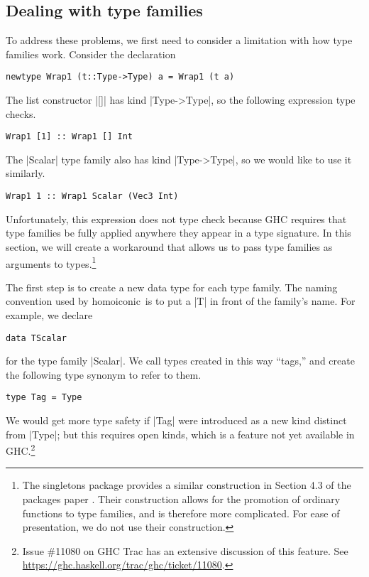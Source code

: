 \documentclass[preprint]{sigplanconf}
\theoremstyle{definition}
\newcommand{\homoiconic}{{\ttfamily homoiconic}~}
\begin{document}
\subsection{Dealing with type families}
To address these problems, we first need to consider a limitation with how type families work.
Consider the declaration
\begin{lstlisting}
newtype Wrap1 (t::Type->Type) a = Wrap1 (t a)
\end{lstlisting}
The list constructor |[]| has kind |Type->Type|,
so the following expression type checks.
\begin{lstlisting}
Wrap1 [1] :: Wrap1 [] Int
\end{lstlisting}
The |Scalar| type family also has kind |Type->Type|,
so we would like to use it similarly.
\begin{lstlisting}
Wrap1 1 :: Wrap1 Scalar (Vec3 Int)
\end{lstlisting}
Unfortunately, this expression does not type check because GHC requires that type families be fully applied anywhere they appear in a type signature.
In this section, we will create a workaround that allows us to pass type families as arguments to types.\footnote{
    The {\ttfamily singletons} package provides a similar construction in Section 4.3 of the packages paper \cite{eisenberg2015promoting}.
    Their construction allows for the promotion of ordinary functions to type families,
    and is therefore more complicated.
    For ease of presentation, we do not use their construction.
}

The first step is to create a new data type for each type family.
The naming convention used by \homoiconic is to put a |T| in front of the family's name.
For example, we declare
\begin{lstlisting}
data TScalar
\end{lstlisting}
for the type family |Scalar|.
We call types created in this way ``tags,''
and create the following type synonym to refer to them.
\begin{lstlisting}
type Tag = Type
\end{lstlisting}
We would get more type safety if |Tag| were introduced as a new kind distinct from |Type|;
but this requires open kinds, which is a feature not yet available in GHC.\footnote{
    Issue \#11080 on GHC Trac has an extensive discussion of this feature.
    See \url{https://ghc.haskell.org/trac/ghc/ticket/11080}.
}
\end{document}
